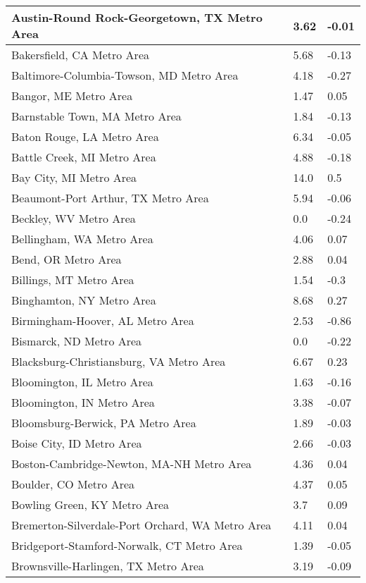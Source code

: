 \documentclass[12pt,oneside, letterpaper]{book}
\begin{document}
\begin{longtable}{| p{} | p{} | p{} |}
    Austin-Round Rock-Georgetown, TX Metro Area & 3.62 & -0.01 \\ \hline
    Bakersfield, CA Metro Area & 5.68 & -0.13 \\ \hline
    Baltimore-Columbia-Towson, MD Metro Area & 4.18 & -0.27 \\ \hline
    Bangor, ME Metro Area & 1.47 & 0.05 \\ \hline
    Barnstable Town, MA Metro Area & 1.84 & -0.13 \\ \hline
    Baton Rouge, LA Metro Area & 6.34 & -0.05 \\ \hline
    Battle Creek, MI Metro Area & 4.88 & -0.18 \\ \hline
    Bay City, MI Metro Area & 14.0 & 0.5 \\ \hline
    Beaumont-Port Arthur, TX Metro Area & 5.94 & -0.06 \\ \hline
    Beckley, WV Metro Area & 0.0 & -0.24 \\ \hline
    Bellingham, WA Metro Area & 4.06 & 0.07 \\ \hline
    Bend, OR Metro Area & 2.88 & 0.04 \\ \hline
    Billings, MT Metro Area & 1.54 & -0.3 \\ \hline
    Binghamton, NY Metro Area & 8.68 & 0.27 \\ \hline
    Birmingham-Hoover, AL Metro Area & 2.53 & -0.86 \\ \hline
    Bismarck, ND Metro Area & 0.0 & -0.22 \\ \hline
    Blacksburg-Christiansburg, VA Metro Area & 6.67 & 0.23 \\ \hline
    Bloomington, IL Metro Area & 1.63 & -0.16 \\ \hline
    Bloomington, IN Metro Area & 3.38 & -0.07 \\ \hline
    Bloomsburg-Berwick, PA Metro Area & 1.89 & -0.03 \\ \hline
    Boise City, ID Metro Area & 2.66 & -0.03 \\ \hline
    Boston-Cambridge-Newton, MA-NH Metro Area & 4.36 & 0.04 \\ \hline
    Boulder, CO Metro Area & 4.37 & 0.05 \\ \hline
    Bowling Green, KY Metro Area & 3.7 & 0.09 \\ \hline
    Bremerton-Silverdale-Port Orchard, WA Metro Area & 4.11 & 0.04 \\ \hline
    Bridgeport-Stamford-Norwalk, CT Metro Area & 1.39 & -0.05 \\ \hline
    Brownsville-Harlingen, TX Metro Area & 3.19 & -0.09 \\ \hline

\end{longtable}
\end{document}
